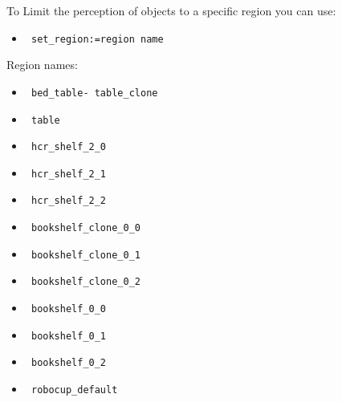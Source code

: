 \documentclass[main.tex]{subfiles}
\begin{document}
To Limit the perception of objects to a specific region you can use:
\begin{itemize}
\item \begin{verbatim} set_region:=region name \end{verbatim} 
\end{itemize}
Region names:
\begin{itemize}
\item \begin{verbatim} bed_table- table_clone \end{verbatim} 
\item \begin{verbatim} table \end{verbatim} 
\item \begin{verbatim} hcr_shelf_2_0 \end{verbatim} 
\item \begin{verbatim} hcr_shelf_2_1 \end{verbatim}
\item \begin{verbatim} hcr_shelf_2_2 \end{verbatim}
\item \begin{verbatim} bookshelf_clone_0_0 \end{verbatim} 
\item \begin{verbatim} bookshelf_clone_0_1 \end{verbatim} 
\item \begin{verbatim} bookshelf_clone_0_2 \end{verbatim} 
\item \begin{verbatim} bookshelf_0_0 \end{verbatim} 
\item \begin{verbatim} bookshelf_0_1 \end{verbatim} 
\item \begin{verbatim} bookshelf_0_2 \end{verbatim} 
\item \begin{verbatim} robocup_default \end{verbatim} 
\end{itemize}
\end{document}
